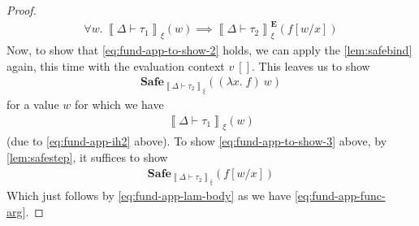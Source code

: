 \documentclass{article}
\newcommand{\empectx}{[]}
\newcommand{\semtyp}[3]{\left\llbracket #2 \vdash #3 \right\rrbracket_{#1}}
\newcommand{\semErel}[1]{#1^{\textbf{E}}}
\newcommand{\semenv}{\xi}
\newcommand{\CtxTps}{\Delta}
\newcommand{\exprB}{f}
\newcommand{\val}{v}
\newcommand{\valB}{w}
\newcommand{\var}{x}
\newcommand{\typ}{\tau}
\newcommand{\Safe}[1]{\textbf{Safe}_{#1}}
\begin{document}
\begin{proof}
\begin{align}
  \label{eq:fund-app-lam-body}
  \forall \valB.~\semtyp{\semenv}{\CtxTps}{\typ_1}(\valB) \implies \semErel{\semtyp{\semenv}{\CtxTps}{\typ_2}}(\exprB[\valB/\var])
\end{align}
Now, to show that \eqref{eq:fund-app-to-show-2} holds, we can apply the \ref{lem:safebind} again, this time with the evaluation context $\val~\empectx$.
This leaves us to show
\begin{align}
  \label{eq:fund-app-to-show-3}
  \Safe{\semtyp{\semenv}{\CtxTps}{\typ_2}}((\lambda \var.\; \exprB)~\valB)
\end{align}
for a value $\valB$ for which we have
\begin{align}
  \label{eq:fund-app-func-arg}
  \semtyp{\semenv}{\CtxTps}{\typ_1}(\valB)
\end{align}
(due to \eqref{eq:fund-app-ih2} above).
To show \eqref{eq:fund-app-to-show-3} above, by \ref{lem:safestep}, it suffices to show
\begin{align}
  \label{eq:fund-app-to-show-4}
  \Safe{\semtyp{\semenv}{\CtxTps}{\typ_2}}(\exprB[\valB/\var])
\end{align}
Which just follows by \eqref{eq:fund-app-lam-body} as we have \eqref{eq:fund-app-func-arg}.


\end{proof}
\end{document}
